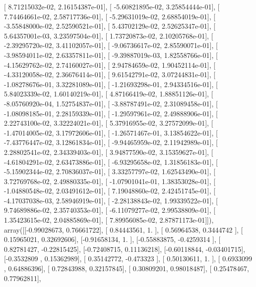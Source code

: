 \documentclass{article}
\begin{document}
       [  8.71215032e-02,   2.16154387e-01],
       [ -5.60821895e-02,   3.25854444e-01],
       [  7.74464661e-02,   2.58717736e-01],
       [ -5.29631019e-02,   2.68854019e-01],
       [ -3.55848000e-02,   2.52590521e-01],
       [  5.43702129e-02,   2.52625347e-01],
       [  5.64357001e-03,   3.23597504e-01],
       [  1.73720873e-02,   2.10205768e-01],
       [ -2.39295720e-02,   3.41102057e-01],
       [ -9.06736617e-02,   2.85590071e-01],
       [ -3.98594011e-02,   2.63357811e-01],
       [ -9.39887019e-03,   1.82558766e-01],
       [ -4.15629762e-02,   2.74160027e-01],
       [  2.94784659e-02,   1.90452114e-01],
       [ -4.33120058e-02,   2.36676414e-01],
       [  9.61542791e-02,   3.07244831e-01],
       [ -1.08278676e-01,   3.32281089e-01],
       [ -1.21693298e-01,   2.94334516e-01],
       [  5.84023339e-02,   1.60140219e-01],
       [  4.87166419e-02,   1.88851126e-01],
       [ -8.05760920e-04,   1.52754837e-01],
       [ -3.88787491e-02,   2.31089458e-01],
       [ -1.08098185e-01,   2.28159339e-01],
       [ -1.29597961e-02,   2.49888906e-01],
       [  2.22743100e-02,   3.32224021e-01],
       [  5.37916955e-02,   3.27572099e-01],
       [ -1.47014005e-02,   3.17972606e-01],
       [ -1.26571467e-01,   3.13854622e-01],
       [ -7.43776447e-02,   3.12861834e-01],
       [ -9.94465959e-02,   2.11942989e-01],
       [  2.28802541e-02,   2.34339403e-01],
       [  3.94877590e-02,   3.15359627e-01],
       [ -4.61804291e-02,   2.63473886e-01],
       [ -6.93295658e-02,   1.31856183e-01],
       [ -5.15902344e-02,   2.70836037e-01],
       [  3.33257797e-02,   1.62543490e-01],
       [  3.72769768e-02,   2.49880335e-01],
       [ -1.07901041e-01,   1.38353028e-01],
       [ -1.04880548e-02,   2.03491612e-01],
       [  7.19048860e-02,   2.42451745e-01],
       [ -4.17037038e-03,   2.58946919e-01],
       [ -2.28138843e-02,   1.99339522e-01],
       [  9.74689886e-02,   2.35740353e-01],
       [ -6.11079277e-02,   2.99538809e-01],
       [  1.35423615e-02,   2.04885869e-01],
       [  7.89956085e-02,   2.87871173e-01]]), array([[-0.99028673,  0.76661722],
       [ 0.84443561,  1.        ],
       [ 0.56964538,  0.3444742 ],
       [ 0.15965021,  0.32692606],
       [-0.91658134,  1.        ],
       [-0.55883875, -0.4259314 ],
       [ 0.82781427, -0.22815425],
       [-0.72408715,  0.11136218],
       [-0.60118844, -0.03401715],
       [-0.3532809 ,  0.15362989],
       [ 0.35142772, -0.473323  ],
       [ 0.50130611,  1.        ],
       [ 0.6933099 ,  0.64886396],
       [ 0.72843988,  0.32157845],
       [ 0.30809201,  0.98018487],
       [ 0.25478467,  0.77962811],
\end{document}
